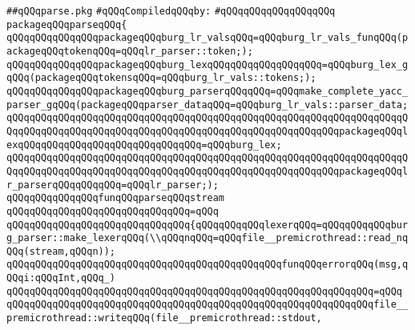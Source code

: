\label{src/app/burg/parse.pkg}
\verb|##qQQqparse.pkg|\newline
\newline
\verb|#qQQqCompiledqQQqby:|\newline
\verb|#qQQqqQQqqQQqqQQqqQQq|\newline
\newline
\newline
\verb|packageqQQqparseqQQq{|\newline
\newline
\verb|qQQqqQQqqQQqqQQqpackageqQQqburg_lr_valsqQQq=qQQqburg_lr_vals_funqQQq(packageqQQqtokenqQQq=qQQqlr_parser::token;);|\newline
\verb|qQQqqQQqqQQqqQQqpackageqQQqburg_lexqQQqqQQqqQQqqQQqqQQq=qQQqburg_lex_gqQQq(packageqQQqtokensqQQq=qQQqburg_lr_vals::tokens;);|\newline
\verb|qQQqqQQqqQQqqQQqpackageqQQqburg_parserqQQqqQQq=qQQqmake_complete_yacc_parser_gqQQq(packageqQQqparser_dataqQQq=qQQqburg_lr_vals::parser_data;|\newline
\verb|qQQqqQQqqQQqqQQqqQQqqQQqqQQqqQQqqQQqqQQqqQQqqQQqqQQqqQQqqQQqqQQqqQQqqQQqqQQqqQQqqQQqqQQqqQQqqQQqqQQqqQQqqQQqqQQqqQQqqQQqqQQqqQQqpackageqQQqlexqQQqqQQqqQQqqQQqqQQqqQQqqQQqqQQq=qQQqburg_lex;|\newline
\verb|qQQqqQQqqQQqqQQqqQQqqQQqqQQqqQQqqQQqqQQqqQQqqQQqqQQqqQQqqQQqqQQqqQQqqQQqqQQqqQQqqQQqqQQqqQQqqQQqqQQqqQQqqQQqqQQqqQQqqQQqqQQqqQQqpackageqQQqlr_parserqQQqqQQqqQQq=qQQqlr_parser;);|\newline
\newline
\verb|qQQqqQQqqQQqqQQqfunqQQqparseqQQqstream|\newline
\verb|qQQqqQQqqQQqqQQqqQQqqQQqqQQqqQQq=qQQq|\newline
\verb|qQQqqQQqqQQqqQQqqQQqqQQqqQQqqQQq{qQQqqQQqqQQqlexerqQQq=qQQqqQQqqQQqburg_parser::make_lexerqQQq(\\qQQqnqQQq=qQQqfile__premicrothread::read_nqQQq(stream,qQQqn));|\newline
\newline
\verb|qQQqqQQqqQQqqQQqqQQqqQQqqQQqqQQqqQQqqQQqqQQqqQQqfunqQQqerrorqQQq(msg,qQQqi:qQQqInt,qQQq_)|\newline
\verb|qQQqqQQqqQQqqQQqqQQqqQQqqQQqqQQqqQQqqQQqqQQqqQQqqQQqqQQqqQQqqQQq=qQQq|\newline
\verb|qQQqqQQqqQQqqQQqqQQqqQQqqQQqqQQqqQQqqQQqqQQqqQQqqQQqqQQqqQQqqQQqfile__premicrothread::writeqQQq(file__premicrothread::stdout,|\newline
